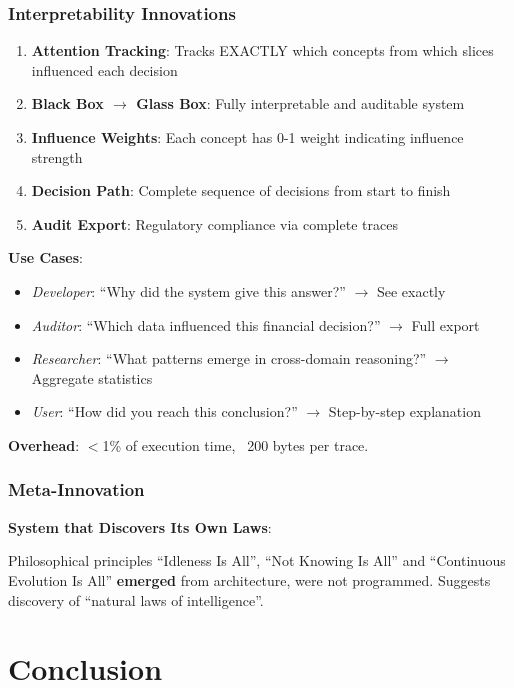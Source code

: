 \documentclass[11pt]{article}
\begin{document}
\subsubsection{Interpretability Innovations}

\begin{enumerate}
    \item \textbf{Attention Tracking}: Tracks EXACTLY which concepts from which slices influenced each decision
    \item \textbf{Black Box $\rightarrow$ Glass Box}: Fully interpretable and auditable system
    \item \textbf{Influence Weights}: Each concept has 0-1 weight indicating influence strength
    \item \textbf{Decision Path}: Complete sequence of decisions from start to finish
    \item \textbf{Audit Export}: Regulatory compliance via complete traces
\end{enumerate}

\textbf{Use Cases}:
\begin{itemize}
    \item \textit{Developer}: ``Why did the system give this answer?'' $\rightarrow$ See exactly
    \item \textit{Auditor}: ``Which data influenced this financial decision?'' $\rightarrow$ Full export
    \item \textit{Researcher}: ``What patterns emerge in cross-domain reasoning?'' $\rightarrow$ Aggregate statistics
    \item \textit{User}: ``How did you reach this conclusion?'' $\rightarrow$ Step-by-step explanation
\end{itemize}

\textbf{Overhead}: $<$1\% of execution time, ~200 bytes per trace.

\subsubsection{Meta-Innovation}

\textbf{System that Discovers Its Own Laws}:

Philosophical principles ``Idleness Is All'', ``Not Knowing Is All'' and ``Continuous Evolution Is All'' \textbf{emerged} from architecture, were not programmed. Suggests discovery of ``natural laws of intelligence''.

\section{Conclusion}
\end{document}
